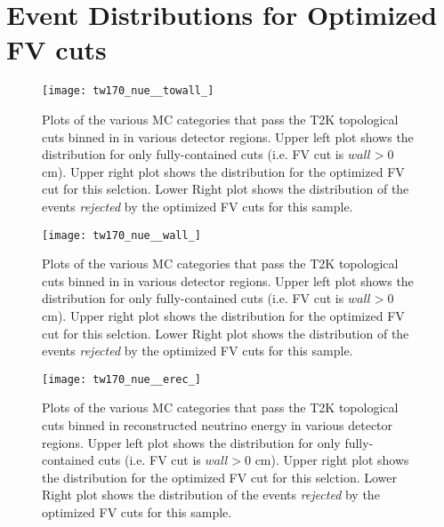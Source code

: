\section{Event Distributions for Optimized FV cuts}
\label{sec:evtdist}

\begin{figure}[h]
  \begin{center}
    \texttt{[image: tw170\_nue\_\_towall\_]}
  \end{center}
  \caption{Plots of the various MC categories that pass the T2K \nue
  topological cuts binned in \towall in various detector regions. Upper left
  plot shows the distribution for only fully-contained cuts (i.e. FV cut is \@ $wall > 0$ cm).
  Upper right plot shows the distribution for the optimized FV cut for this selction.
  Lower Right plot shows the distribution of the events \emph{rejected} by the optimized
  FV cuts for this sample.
  }
  \label{fig:compnuetowall}
\end{figure}


\begin{figure}[h]
  \begin{center}
    \texttt{[image: tw170\_nue\_\_wall\_]}
  \end{center}
  \caption{Plots of the various MC categories that pass the T2K \nue
  topological cuts binned in \wall in various detector regions. Upper left
  plot shows the distribution for only fully-contained cuts (i.e. FV cut is \@ $wall > 0$ cm).
  Upper right plot shows the distribution for the optimized FV cut for this selction.
  Lower Right plot shows the distribution of the events \emph{rejected} by the optimized
  FV cuts for this sample.
  }
  \label{fig:compnuewall}
\end{figure}


\begin{figure}[h]
  \begin{center}
    \texttt{[image: tw170\_nue\_\_erec\_]}
  \end{center}
  \caption{Plots of the various MC categories that pass the T2K \nue
  topological cuts binned in reconstructed neutrino energy in various detector
  regions. Upper left plot shows the distribution for only fully-contained cuts
  (i.e. FV cut is \@ $wall > 0$ cm).  Upper right plot shows the distribution
  for the optimized FV cut for this selction.  Lower Right plot shows the
  distribution of the events \emph{rejected} by the optimized FV cuts for this
  sample.
  }
  \label{fig:compnueerec}
\end{figure}

